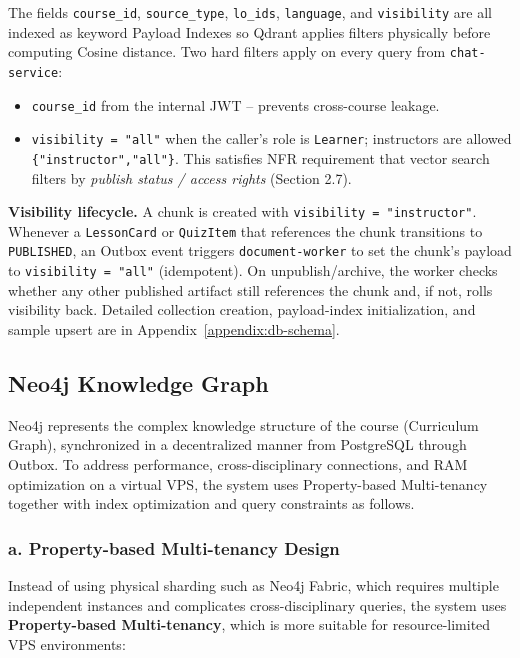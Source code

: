 The fields \texttt{course\_id}, \texttt{source\_type},
\texttt{lo\_ids}, \texttt{language}, and \texttt{visibility} are all
indexed as keyword Payload Indexes so Qdrant applies filters physically
before computing Cosine distance. Two hard filters apply on every query
from \texttt{chat-service}:

\begin{itemize}
    \item \texttt{course\_id} from the internal JWT -- prevents
          cross-course leakage.
    \item \texttt{visibility = "all"} when the caller's role is
          \texttt{Learner}; instructors are allowed
          \texttt{\{"instructor","all"\}}. This satisfies NFR
          requirement that vector search filters by \emph{publish
          status / access rights} (Section 2.7).
\end{itemize}

\textbf{Visibility lifecycle.} A chunk is created with
\texttt{visibility = "instructor"}. Whenever a \texttt{LessonCard} or
\texttt{QuizItem} that references the chunk transitions to
\texttt{PUBLISHED}, an Outbox event triggers
\texttt{document-worker} to set the chunk's payload to
\texttt{visibility = "all"} (idempotent). On unpublish/archive, the
worker checks whether any other published artifact still references the
chunk and, if not, rolls visibility back. Detailed collection creation,
payload-index initialization, and sample upsert are in
Appendix~\ref{appendix:db-schema}.

\subsection{Neo4j Knowledge Graph}
\label{subsec:neo4j-knowledge-graph}

Neo4j represents the complex knowledge structure of the course
(Curriculum Graph), synchronized in a decentralized manner from
PostgreSQL through Outbox. To address performance, cross-disciplinary
connections, and RAM optimization on a virtual VPS, the system uses
Property-based Multi-tenancy together with index optimization and query
constraints as follows.

\subsubsection*{a. Property-based Multi-tenancy Design}

Instead of using physical sharding such as Neo4j Fabric, which requires
multiple independent instances and complicates cross-disciplinary queries,
the system uses \textbf{Property-based Multi-tenancy}, which is more
suitable for resource-limited VPS environments:

